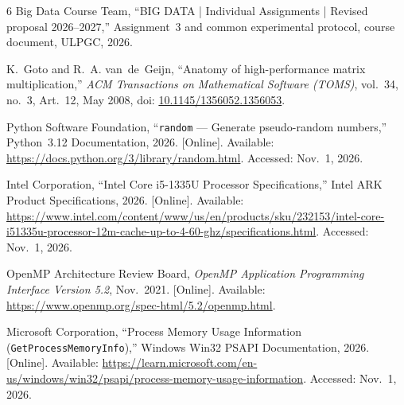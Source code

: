 \documentclass[11pt,a4paper]{article}
\begin{document}
\begin{thebibliography}{6}
Big Data Course Team, ``BIG DATA | Individual Assignments | Revised proposal 2026--2027,'' Assignment~3 and common experimental protocol, course document, ULPGC, 2026.

K.~Goto and R.~A. van~de~Geijn, ``Anatomy of high-performance matrix multiplication,'' \emph{ACM Transactions on Mathematical Software (TOMS)}, vol.~34, no.~3, Art.~12, May 2008, doi: \href{https://doi.org/10.1145/1356052.1356053}{10.1145/1356052.1356053}.

Python Software Foundation, ``\texttt{random} --- Generate pseudo-random numbers,'' Python~3.12 Documentation, 2026. [Online]. Available: \url{https://docs.python.org/3/library/random.html}. Accessed: Nov.~1, 2026.

Intel Corporation, ``Intel Core i5-1335U Processor Specifications,'' Intel ARK Product Specifications, 2026. [Online]. Available: \url{https://www.intel.com/content/www/us/en/products/sku/232153/intel-core-i51335u-processor-12m-cache-up-to-4-60-ghz/specifications.html}. Accessed: Nov.~1, 2026.

OpenMP Architecture Review Board, \emph{OpenMP Application Programming Interface Version 5.2}, Nov.~2021. [Online]. Available: \url{https://www.openmp.org/spec-html/5.2/openmp.html}.

Microsoft Corporation, ``Process Memory Usage Information (\texttt{GetProcessMemoryInfo}),'' Windows Win32 PSAPI Documentation, 2026. [Online]. Available: \url{https://learn.microsoft.com/en-us/windows/win32/psapi/process-memory-usage-information}. Accessed: Nov.~1, 2026.
\end{thebibliography}
\end{document}
